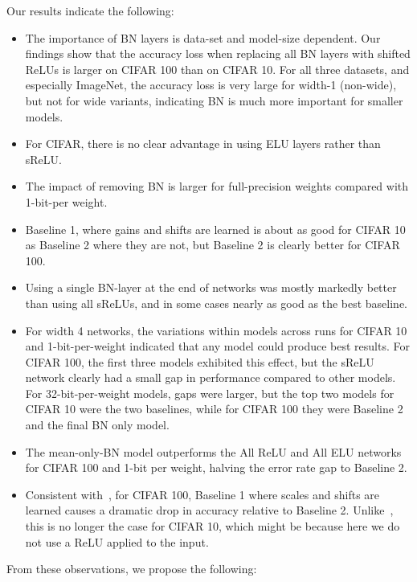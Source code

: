 \documentclass[conference]{IEEEtran}
\begin{document}
Our results indicate the following:
\begin{itemize}
    \item The importance of BN layers is data-set and model-size dependent. Our findings show that the accuracy loss when replacing all BN layers with shifted ReLUs is larger on CIFAR 100 than on CIFAR 10. For all three datasets, and especially ImageNet,  the accuracy loss is very large for width-1 (non-wide), but not for wide variants, indicating BN is much more important for smaller models.
    \item For CIFAR, there is no clear advantage in using ELU layers rather than sReLU.
    \item The impact of removing BN is larger for full-precision weights compared with 1-bit-per weight.
    \item Baseline 1, where gains and shifts are learned is about as  good for CIFAR 10 as Baseline 2 where they are not, but Baseline 2 is clearly better for CIFAR 100. 
    \item Using a single BN-layer at the end of networks was mostly markedly better than using all sReLUs, and in some cases nearly as good as the best baseline.
    \item For width 4 networks, the variations within models across runs for CIFAR 10 and 1-bit-per-weight indicated that any model could produce best results. For CIFAR 100, the first three models exhibited this effect, but the sReLU network clearly had a small gap in performance compared to other models. For 32-bit-per-weight models, gaps were larger, but the top two models for CIFAR 10 were the two baselines, while for CIFAR 100 they were Baseline 2 and the final BN only model.
    \item The mean-only-BN model outperforms the All ReLU and All ELU networks for CIFAR 100 and 1-bit per weight, halving the error rate gap to Baseline 2.
\item Consistent with~\cite{McDonnell.18}, for CIFAR 100, Baseline 1 where scales and shifts are learned causes a dramatic drop in accuracy relative to Baseline 2. Unlike~\cite{McDonnell.18}, this is no longer the case for CIFAR 10, which might be because here we do not use a ReLU applied to the input.
\end{itemize}
From these observations, we propose the following:
\end{document}
